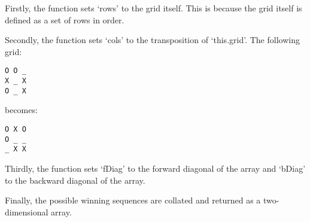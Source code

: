 \documentclass{article}
\begin{document}
Firstly, the function sets `rows' to the grid itself. This is because the grid itself is defined as a set of rows in order.

Secondly, the function sets `cols' to the transposition of `this.grid'. The following grid:

\begin{verbatim}
O O _
X _ X
O _ X
\end{verbatim}

becomes:

\begin{verbatim}
O X O
O _ _
_ X X
\end{verbatim}

Thirdly, the function sets `fDiag' to the forward diagonal of the array and `bDiag' to the backward diagonal of the array.

Finally, the possible winning sequences are collated and returned as a two-dimensional array.
\end{document}
